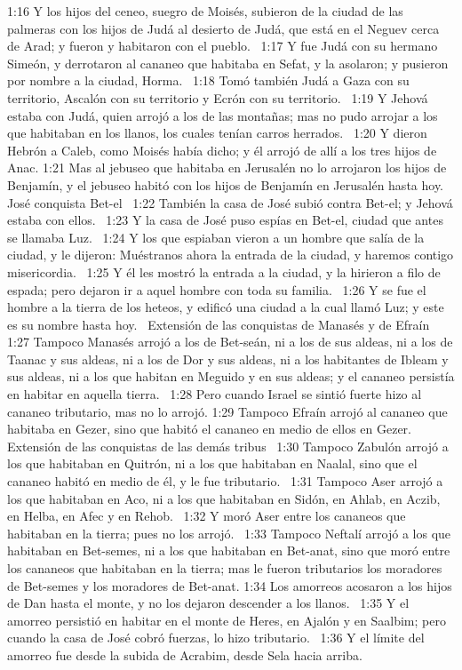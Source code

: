 1:16 Y los hijos del ceneo, suegro de Moisés, subieron de la ciudad de las palmeras con los hijos de Judá al desierto de Judá, que está en el Neguev cerca de Arad; y fueron y habitaron con el pueblo.  
1:17 Y fue Judá con su hermano Simeón, y derrotaron al cananeo que habitaba en Sefat, y la asolaron; y pusieron por nombre a la ciudad, Horma.  
1:18 Tomó también Judá a Gaza con su territorio, Ascalón con su territorio y Ecrón con su territorio.  
1:19 Y Jehová estaba con Judá, quien arrojó a los de las montañas; mas no pudo arrojar a los que habitaban en los llanos, los cuales tenían carros herrados.  
1:20 Y dieron Hebrón a Caleb, como Moisés había dicho; y él arrojó de allí a los tres hijos de Anac. 
1:21 Mas al jebuseo que habitaba en Jerusalén no lo arrojaron los hijos de Benjamín, y el jebuseo habitó con los hijos de Benjamín en Jerusalén hasta hoy. 
José conquista Bet-el  
1:22 También la casa de José subió contra Bet-el; y Jehová estaba con ellos.  
1:23 Y la casa de José puso espías en Bet-el, ciudad que antes se llamaba Luz.  
1:24 Y los que espiaban vieron a un hombre que salía de la ciudad, y le dijeron: Muéstranos ahora la entrada de la ciudad, y haremos contigo misericordia.  
1:25 Y él les mostró la entrada a la ciudad, y la hirieron a filo de espada; pero dejaron ir a aquel hombre con toda su familia.  
1:26 Y se fue el hombre a la tierra de los heteos, y edificó una ciudad a la cual llamó Luz; y este es su nombre hasta hoy.  
Extensión de las conquistas de Manasés y de Efraín  
1:27 Tampoco Manasés arrojó a los de Bet-seán, ni a los de sus aldeas, ni a los de Taanac y sus aldeas, ni a los de Dor y sus aldeas, ni a los habitantes de Ibleam y sus aldeas, ni a los que habitan en Meguido y en sus aldeas; y el cananeo persistía en habitar en aquella tierra.  
1:28 Pero cuando Israel se sintió fuerte hizo al cananeo tributario, mas no lo arrojó. 
1:29 Tampoco Efraín arrojó al cananeo que habitaba en Gezer, sino que habitó el cananeo en medio de ellos en Gezer. 
Extensión de las conquistas de las demás tribus  
1:30 Tampoco Zabulón arrojó a los que habitaban en Quitrón, ni a los que habitaban en Naalal, sino que el cananeo habitó en medio de él, y le fue tributario.  
1:31 Tampoco Aser arrojó a los que habitaban en Aco, ni a los que habitaban en Sidón, en Ahlab, en Aczib, en Helba, en Afec y en Rehob.  
1:32 Y moró Aser entre los cananeos que habitaban en la tierra; pues no los arrojó.  
1:33 Tampoco Neftalí arrojó a los que habitaban en Bet-semes, ni a los que habitaban en Bet-anat, sino que moró entre los cananeos que habitaban en la tierra; mas le fueron tributarios los moradores de Bet-semes y los moradores de Bet-anat. 
1:34 Los amorreos acosaron a los hijos de Dan hasta el monte, y no los dejaron descender a los llanos.  
1:35 Y el amorreo persistió en habitar en el monte de Heres, en Ajalón y en Saalbim; pero cuando la casa de José cobró fuerzas, lo hizo tributario.  
1:36 Y el límite del amorreo fue desde la subida de Acrabim, desde Sela hacia arriba.  
